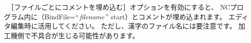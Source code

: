 
　［ファイルごとにコメントを埋め込む］オプションを有効にすると、
NCプログラム内に（BindFile=``\,\textit{filename}\,'' start）とコメントが埋め込まれます。
エディタ編集時に活用してください。
ただし、漢字のファイル名には要注意です。
加工機側で不具合が生じる可能性があります。
